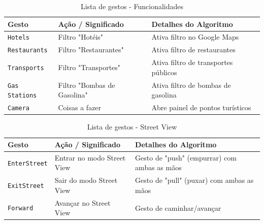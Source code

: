 \documentclass{report}
\begin{document}
\begin{longtable}{p{} p{} p{}}
    \caption{Lista de gestos - Funcionalidades} 
    \label{tab:gestos_funcionalidades} \\
    
    \toprule
    \textbf{Gesto} & \textbf{Ação / Significado} & \textbf{Detalhes do Algoritmo} \\
    \midrule
    \endfirsthead
    \endlastfoot
    
    \texttt{Hotels} & Filtro "Hotéis" & Ativa filtro no Google Maps \\
    \texttt{Restaurants} & Filtro "Restaurantes" & Ativa filtro de restaurantes \\
    \texttt{Transports} & Filtro "Transportes" & Ativa filtro de transportes públicos \\
    \texttt{Gas Stations} & Filtro "Bombas de Gasolina" & Ativa filtro de bombas de gasolina \\
    \texttt{Camera} & Coisas a fazer & Abre painel de pontos turísticos \\
\end{longtable}


\begin{longtable}{p{} p{} p{}}
    \caption{Lista de gestos - Street View} 
    \label{tab:gestos-street-view} \\
    
    \toprule
    \textbf{Gesto} & \textbf{Ação / Significado} & \textbf{Detalhes do Algoritmo} \\
    \midrule
    \endfirsthead
    \endlastfoot
    
    \texttt{EnterStreet} & Entrar no modo Street View & Gesto de "push" (empurrar) com ambas as mãos \\
    \texttt{ExitStreet} & Sair do modo Street View & Gesto de "pull" (puxar) com ambas as mãos \\
    \texttt{Forward} & Avançar no Street View & Gesto de caminhar/avançar \\
\end{longtable}
\end{document}

